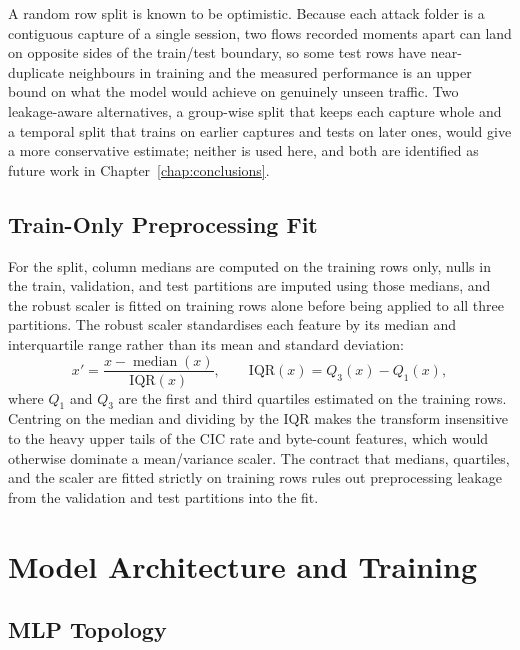 \par A random row split is known to be optimistic. Because each attack folder is a contiguous capture of a single session, two flows recorded moments apart can land on opposite sides of the train/test boundary, so some test rows have near-duplicate neighbours in training and the measured performance is an upper bound on what the model would achieve on genuinely unseen traffic. Two leakage-aware alternatives, a group-wise split that keeps each capture whole and a temporal split that trains on earlier captures and tests on later ones, would give a more conservative estimate; neither is used here, and both are identified as future work in Chapter~\ref{chap:conclusions}.

\subsection{Train-Only Preprocessing Fit}
\label{subsec:train_fit_preprocess}

\par For the split, column medians are computed on the training rows only, nulls in the train, validation, and test partitions are imputed using those medians, and the robust scaler is fitted on training rows alone before being applied to all three partitions. The robust scaler standardises each feature by its median and interquartile range rather than its mean and standard deviation:
\begin{equation}
    x' = \frac{x - \operatorname{median}(x)}{\mathrm{IQR}(x)}, \qquad \mathrm{IQR}(x) = Q_3(x) - Q_1(x),
    \label{eq:robust_scaler}
\end{equation}
where $Q_1$ and $Q_3$ are the first and third quartiles estimated on the training rows. Centring on the median and dividing by the IQR makes the transform insensitive to the heavy upper tails of the CIC rate and byte-count features, which would otherwise dominate a mean/variance scaler. The contract that medians, quartiles, and the scaler are fitted strictly on training rows rules out preprocessing leakage from the validation and test partitions into the fit.

\section{Model Architecture and Training}
\label{sec:model_architecture}

\subsection{MLP Topology}
\label{subsec:mlp_topology}

